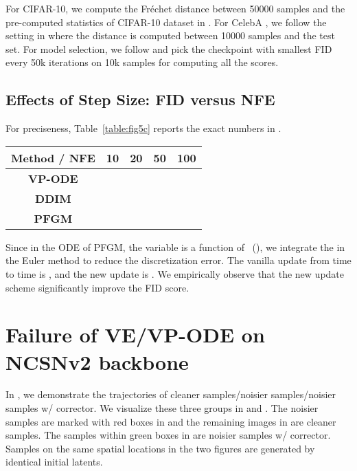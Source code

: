 For CIFAR-10, we compute the Fréchet distance between 50000 samples and the pre-computed statistics of CIFAR-10 dataset in \cite{Heusel2017GANsTB}. For CelebA , we follow the setting in \cite{Song2020ImprovedTF} where the distance is computed between 10000 samples and the test set. For model selection, we follow \cite{Song2020ImprovedTF} and pick the checkpoint with smallest FID every 50k iterations on 10k samples for computing all the scores.

\subsection{Effects of Step Size: FID versus NFE}

For preciseness, Table~\ref{table:fig5c} reports the exact numbers in . 
\begin{table*}[htb]
\begin{center}
\caption{The FID scores in  of different methods and NFE.}
\label{table:fig5c}
\begin{tabular}{c c c c c}
		\toprule
		\textbf{Method / NFE} &  10 & 20 & 50 & 100\\
		\midrule
			\textbf{VP-ODE} & &  && \\
			\textbf{DDIM} && & & \\
        	\textbf{PFGM} &   & &  &  \\
        \bottomrule
\end{tabular}
\end{center}
\end{table*}

Since in the ODE  of PFGM, the  variable is a function of ~(), we integrate the  in the Euler method to reduce the discretization error. The vanilla update from time  to time  is , and the new update is . We empirically observe that the new update scheme significantly improve the FID score.

\section{Failure of VE/VP-ODE on NCSNv2 backbone}
\label{app:failure}

In , we demonstrate the trajectories of cleaner samples/noisier samples/noisier samples w/ corrector. We visualize these three groups in  and . The noisier samples are marked with red boxes in  and the remaining images in  are cleaner samples. The samples within green boxes in  are noisier samples w/ corrector. Samples on the same spatial locations in the two figures are generated by identical initial latents. 

